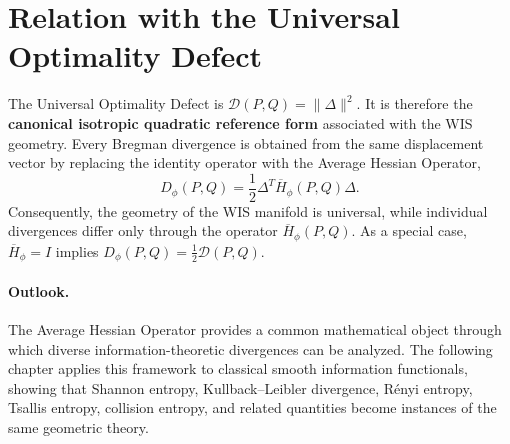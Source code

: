 \section{Relation with the Universal Optimality Defect}\label{ch:sec:relation-with-the-universal-optimality-defect}
The Universal Optimality Defect is
$\mathcal D(P,Q)=\|\Delta\|^2.$
It is therefore the \textbf{canonical isotropic quadratic reference form}
associated with the WIS geometry.
Every Bregman divergence is obtained from the same displacement vector
by replacing the identity operator with the Average Hessian Operator,
\[ D_\phi(P,Q) = \frac12 \Delta^T
\overline H_\phi(P,Q) \Delta. \]
Consequently, the geometry of the WIS manifold is universal, while
individual divergences differ only through the operator
\(\overline H_\phi(P,Q)\).
As a special case,
$\overline H_\phi=I$
implies
$D_\phi(P,Q) = \frac12 \mathcal D(P,Q).$
\paragraph{Outlook.}
The Average Hessian Operator provides a common mathematical object
through which diverse information-theoretic divergences can be analyzed.
The following chapter applies this framework to classical smooth
information functionals, showing that Shannon entropy, Kullback--Leibler
divergence, R\'enyi entropy, Tsallis entropy, collision entropy, and
related quantities become instances of the same geometric theory.
